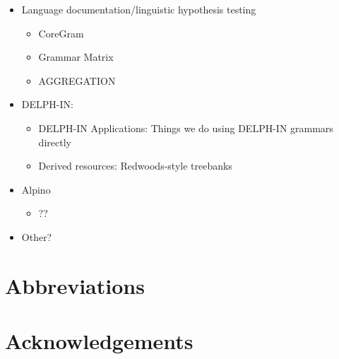 \documentclass[output=paper]{langsci/langscibook}
\begin{document}
\begin{itemize}
 \item Language documentation/linguistic hypothesis testing
    \begin{itemize}
    \item CoreGram
    \item Grammar Matrix
    \item AGGREGATION
    \end{itemize}
 \item DELPH-IN:
    \begin{itemize}
    \item DELPH-IN Applications: Things we do using DELPH-IN grammars directly
    \item Derived resources: Redwoods-style treebanks
    \end{itemize}
 \item Alpino
    \begin{itemize}
    \item ??
    \end{itemize}
 \item Other?
 \end{itemize}

\section*{Abbreviations}
\section*{Acknowledgements}

\printbibliography[heading=subbibliography,notkeyword=this] 
\end{document}
